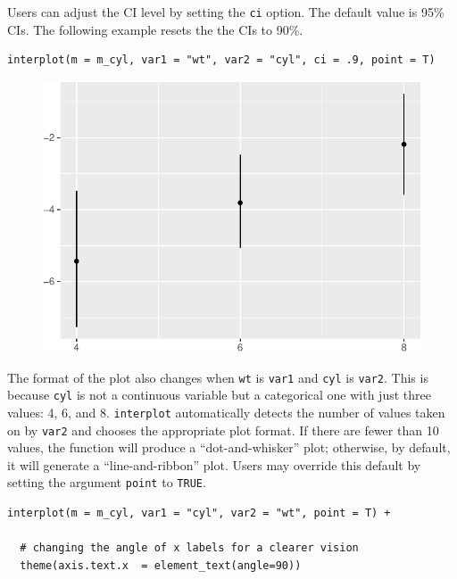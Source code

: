 \documentclass[
  article]{jss}
\begin{document}
Users can adjust the CI level by setting the \texttt{ci} option. The
default value is 95\% CIs. The following example resets the the CIs to
90\%.

\begin{verbatim}
interplot(m = m_cyl, var1 = "wt", var2 = "cyl", ci = .9, point = T)
\end{verbatim}

\begin{figure}[H]

{\centering \includegraphics{jss_manuscript_files/figure-pdf/unnamed-chunk-5-1.pdf}

}

\end{figure}

The format of the plot also changes when \texttt{wt} is \texttt{var1}
and \texttt{cyl} is \texttt{var2}. This is because \texttt{cyl} is not a
continuous variable but a categorical one with just three values: 4, 6,
and 8. \texttt{interplot} automatically detects the number of values
taken on by \texttt{var2} and chooses the appropriate plot format. If
there are fewer than 10 values, the function will produce a
``dot-and-whisker'' plot; otherwise, by default, it will generate a
``line-and-ribbon'' plot. Users may override this default by setting the
argument \texttt{point} to \texttt{TRUE}.

\begin{verbatim}
interplot(m = m_cyl, var1 = "cyl", var2 = "wt", point = T) +

  # changing the angle of x labels for a clearer vision
  theme(axis.text.x  = element_text(angle=90))
\end{verbatim}
\end{document}
